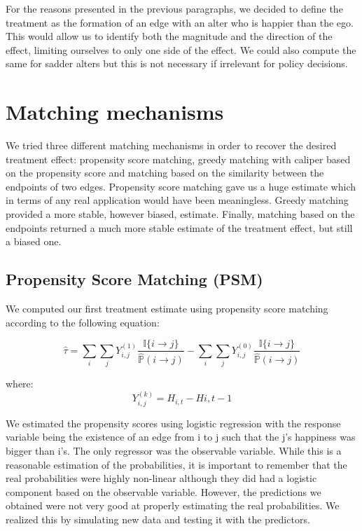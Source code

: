 \documentclass[11pt]{article}
\begin{document}
For the reasons presented in the previous paragraphs, we decided to define the treatment as the formation of an edge with an alter who is happier than the ego. This would allow us to identify both the magnitude and the direction of the effect, limiting ourselves to only one side of the effect. We could also compute the same for sadder alters but this is not necessary if irrelevant for policy decisions. 

\section{Matching mechanisms}
We tried three different matching mechanisms in order to recover the desired treatment effect: propensity score matching, greedy matching with caliper based on the propensity score and matching based on the similarity between the endpoints of two edges. Propensity score matching gave us a huge estimate which in terms of any real application would have been meaningless. Greedy matching provided a more stable, however biased, estimate. Finally, matching based on the endpoints returned a much more stable estimate of the treatment effect, but still a biased one. 

\subsection{Propensity Score Matching (PSM)}

We computed our first treatment estimate using propensity score matching according to the following equation:

$$\hat{\tau} = \sum\limits_i\sum\limits_j Y_{i,j}^{(1)}\frac{\mathbb{I}\{i \rightarrow j\}}{\hat{\mathbb{P}}(i\rightarrow j)} - \sum\limits_i\sum\limits_j Y_{i,j}^{(0)}\frac{\mathbb{I}\{i \rightarrow j\}}{\hat{\mathbb{P}}(i\rightarrow j)}$$

where:
$$Y_{i,j}^(k) = H_{i,t}-H{i,t-1}$$

We estimated the propensity scores using logistic regression with the response variable being the existence of an edge from i to j such that the j's happiness was bigger than i's. The only regressor was the observable variable. While this is a reasonable estimation of the probabilities, it is important to remember that the real probabilities were highly non-linear although they did had a logistic component based on the observable variable. However, the predictions we obtained were not very good at properly estimating the real probabilities. We realized this by simulating new data and testing it with the predictors. 
\end{document}
